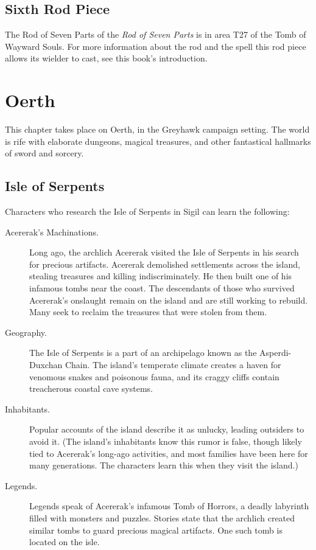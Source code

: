 \documentclass[10pt,a4paper,twoside,bg=print,twocolumn,openany,nodeprecatedcode]{dndbook}
\begin{document}
\subsection{Sixth Rod Piece}
The Rod of Seven Parts of the \textit{Rod of Seven Parts} is in area T27 of the Tomb of Wayward Souls. For more information about the rod and the spell this rod piece allows its wielder to cast, see this book's introduction.

\section{Oerth}
This chapter takes place on Oerth, in the Greyhawk campaign setting. The world is rife with elaborate dungeons, magical treasures, and other fantastical hallmarks of sword and sorcery.

\subsection{Isle of Serpents}
Characters who research the Isle of Serpents in Sigil can learn the following:


\begin{description}
\item[Acererak's Machinations.]
Long ago, the archlich Acererak visited the Isle of Serpents in his search for precious artifacts. Acererak demolished settlements across the island, stealing treasures and killing indiscriminately. He then built one of his infamous tombs near the coast. The descendants of those who survived Acererak's onslaught remain on the island and are still working to rebuild. Many seek to reclaim the treasures that were stolen from them.
\item[Geography.]
The Isle of Serpents is a part of an archipelago known as the Asperdi-Duxchan Chain. The island's temperate climate creates a haven for venomous snakes and poisonous fauna, and its craggy cliffs contain treacherous coastal cave systems.
\item[Inhabitants.]
Popular accounts of the island describe it as unlucky, leading outsiders to avoid it. (The island's inhabitants know this rumor is false, though likely tied to Acererak's long-ago activities, and most families have been here for many generations. The characters learn this when they visit the island.)
\item[Legends.]
Legends speak of Acererak's infamous Tomb of Horrors, a deadly labyrinth filled with monsters and puzzles. Stories state that the archlich created similar tombs to guard precious magical artifacts. One such tomb is located on the isle.
\end{description}
\end{document}
